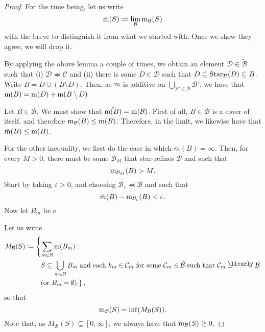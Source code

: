 \begin{thm}
\begin{savenotes}
\begin{proof}
For the time being, let us write
\begin{equation}
\breve{\mathrm{m}}(S)\coloneqq \lim _{\mathcal{B}}\mathrm{m} _{\mathcal{B}}(S)
\end{equation}
with the breve to distinguish it from what we started with.  Once we show they agree, we will drop it.



By applying the above lemma a couple of times, we obtain an element $\mathcal{D}\in \widetilde{\mathcal{B}}$ such that (i) $\mathcal{D}\llcurly \mathcal{C}$ and (ii) there is some $D\in \mathcal{D}$ such that $D\subseteq \operatorname{Star} _{\mathcal{D}}(D)\subseteq B$.  Write $B=D\cup (B\setminus D)$.  Then, as $\mathrm{m}$ is additive on $\bigcup _{\mathcal{B}'\in \widetilde{\mathcal{B}}}\mathcal{B}'$, we have that $\mathrm{m} (B)=\mathrm{m} (D)+\mathrm{m} (B\setminus D)$

Let $B\in \mathcal{B}$.  We must show that $\breve{\mathrm{m} (B)}=\mathrm{m}(\mathcal{B})$.  First of all, $B\in \mathcal{B}$ is a cover of itself, and therefore $\mathrm{m} _{\mathcal{B}}(B)\leq \mathrm{m} (B)$.  Therefore, in the limit, we likewise have that $\breve{\mathrm{m}}(B)\leq \mathrm{m} (B)$.

For the other inequality, we first do the case in which $\breve{m}(B)=\infty$.  Then, for every $M>0$, there must be some $\mathcal{B}_M$ that star-refines $\mathcal{B}$ and such that
\begin{equation}
\mathrm{m} _{\mathcal{B}_M}(B)>M.
\end{equation}
Start by taking $\varepsilon >0$, and choosing $\mathcal{B}_{\varepsilon}\llcurly \mathcal{B}$ and such that
\begin{equation}
\breve{m}(B)-\mathrm{m} _{\mathcal{B}_{\varepsilon }}(B)<\varepsilon .
\end{equation}
Now let $B_m$ be e

Let us write
\begin{equation}
\begin{split}
M_{\mathcal{B}}(S) & \coloneqq \left\{ \sum _{m\in \N}\meas (B_m):\right. \\
& \qquad \left. S\subseteq \bigcup _{m\in \N}B_m\text{ and  each }k_m\in \mathcal{C}_m\text{ for some }\mathcal{C}_m\in \widetilde{\mathcal{B}}\text{ such that }\mathcal{C}_m\llcurlyeq \mathcal{B}\right. \\
& \qquad \left. \text{(or }B_m=\emptyset \text{).}\right\} ,
\end{split}
\end{equation}
so that
\begin{equation}
\mathrm{m} _{\mathcal{B}}(S)=\inf (M_{\mathcal{B}}(S)).
\end{equation}
Note that, as $M_{\mathcal{B}}(S)\subseteq [0,\infty ]$, we always have that $\mathrm{m} _{\mathcal{B}}(S)\geq 0$.


\end{proof}
\end{savenotes}
\end{thm}

